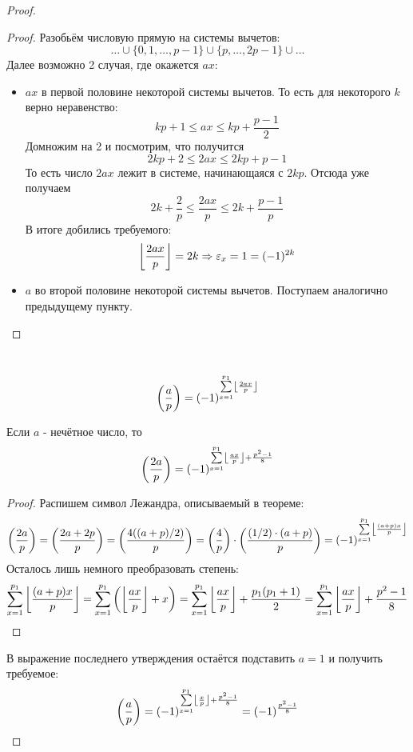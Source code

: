 \begin{proof}
	\begin{proof}
		Разобьём числовую прямую на системы вычетов:
		\[
			\ldots \cup \{0, 1, \ldots, p - 1\} \cup \{p, \ldots, 2p - 1\} \cup \ldots
		\]
		Далее возможно 2 случая, где окажется $ax$:
		\begin{itemize}
			\item $ax$ в первой половине некоторой системы вычетов. То есть для некоторого $k$ верно неравенство:
			\[
				kp + 1 \le ax \le kp + \frac{p - 1}{2}
			\]
			Домножим на 2 и посмотрим, что получится
			\[
				2kp + 2 \le 2ax \le 2kp + p - 1
			\]
			То есть число $2ax$ лежит в системе, начинающаяся с $2kp$. Отсюда уже получаем
			\[
				2k + \frac{2}{p} \le \frac{2ax}{p} \le 2k + \frac{p - 1}{p}
			\]
			В итоге добились требуемого:
			\[
				\left\lfloor \frac{2ax}{p} \right\rfloor = 2k \Rightarrow \varepsilon_x = 1 = (-1)^{2k}
			\]
			
			\item $a$ во второй половине некоторой системы вычетов. Поступаем аналогично предыдущему пункту.
		\end{itemize}
	\end{proof}

	\begin{corollary}~
		\[
			\left(\frac{ a }{ p }\right) = (-1)^{\sum\limits_{x = 1}^{p_1} \left\lfloor \frac{2ax}{p} \right\rfloor}
		\]
	\end{corollary}

	\begin{proposition}
		Если $a$ - нечётное число, то
		\[
			\left(\frac{ 2a }{ p }\right) = (-1)^{\sum\limits_{x = 1}^{p_1} \left\lfloor \frac{ax}{p} \right\rfloor + \frac{p^2 - 1}{8}}
		\]
	\end{proposition}

	\begin{proof}
		Распишем символ Лежандра, описываемый в теореме:
		\[
			\left(\frac{ 2a }{ p }\right) = \left(\frac{ 2a + 2p }{ p }\right) = \left(\frac{ 4((a + p) / 2) }{ p }\right) = \left(\frac{ 4 }{ p }\right) \cdot \left(\frac{ (1/2) \cdot (a + p) }{ p }\right) = (-1)^{\sum\limits_{x = 1}^{p_1} \left\lfloor \frac{(a + p)x}{p} \right\rfloor}
		\]
		Осталось лишь немного преобразовать степень:
		\[
			\sum\limits_{x = 1}^{p_1} \left\lfloor \frac{(a + p)x}{p} \right\rfloor = \sum\limits_{x = 1}^{p_1} \left(\left\lfloor \frac{ax}{p} \right\rfloor + x\right) = \sum\limits_{x = 1}^{p_1} \left\lfloor \frac{ax}{p} \right\rfloor + \frac{p_1(p_1 + 1)}{2} = \sum\limits_{x = 1}^{p_1} \left\lfloor \frac{ax}{p} \right\rfloor + \frac{p^2 - 1}{8}
		\]
	\end{proof}

	В выражение последнего утверждения остаётся подставить $a = 1$ и получить требуемое:
	\[
		\left(\frac{ a }{ p }\right) = (-1)^{\sum\limits_{x = 1}^{p_1} \left\lfloor \frac{x}{p} \right\rfloor + \frac{p^2 - 1}{8}} = (-1)^{\frac{p^2 - 1}{8}}
	\]
\end{proof}

